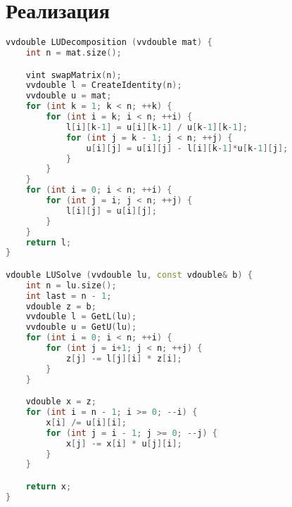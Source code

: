 \section*{Реализация}

\begin{lstlisting}[language=C++]
vvdouble LUDecomposition (vvdouble mat) {
    int n = mat.size();

    vint swapMatrix(n);
    vvdouble l = CreateIdentity(n);
    vvdouble u = mat;
    for (int k = 1; k < n; ++k) {
        for (int i = k; i < n; ++i) {
            l[i][k-1] = u[i][k-1] / u[k-1][k-1];
            for (int j = k - 1; j < n; ++j) {
                u[i][j] = u[i][j] - l[i][k-1]*u[k-1][j];
            }
        }
    }
    for (int i = 0; i < n; ++i) {
        for (int j = i; j < n; ++j) {
            l[i][j] = u[i][j];
        }
    }
    return l;
}

vdouble LUSolve (vvdouble lu, const vdouble& b) {
    int n = lu.size();
    int last = n - 1;
    vdouble z = b;
    vvdouble l = GetL(lu);
    vvdouble u = GetU(lu);
    for (int i = 0; i < n; ++i) {
        for (int j = i+1; j < n; ++j) {
            z[j] -= l[j][i] * z[i];
        }
    }

    vdouble x = z;
    for (int i = n - 1; i >= 0; --i) {
        x[i] /= u[i][i];
        for (int j = i - 1; j >= 0; --j) {
            x[j] -= x[i] * u[j][i];
        }
    }

    return x;
}
\end{lstlisting}



\pagebreak